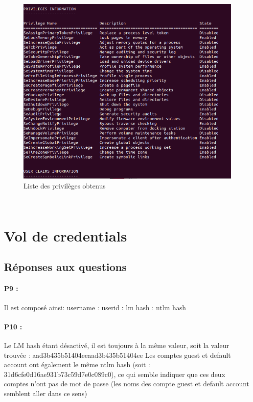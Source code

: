 \documentclass[12pt]{report} %
\begin{document}
\begin{figure}[!h]
	\includegraphics[width=17cm]{Privileges_3_2.PNG}
	\caption*{Liste des privilèges obtenus}
\end{figure}


\newpage
~
\newpage

\section*{Vol de credentials}

\subsection*{Réponses aux questions}

\paragraph{P9 :}	Il est composé ainsi: username : userid : lm hash : ntlm hash
\paragraph{P10 :} Le LM hash étant désactivé, il est toujours à la même valeur, soit la valeur trouvée : aad3b435b51404eeaad3b435b51404ee
Les comptes guest et default account ont également le même ntlm hash (soit : 31d6cfe0d16ae931b73c59d7e0c089c0), ce qui semble indiquer que ces deux comptes n'ont pas de mot de passe (les noms des compte guest et default account semblent aller dans ce sens)
\end{document}
